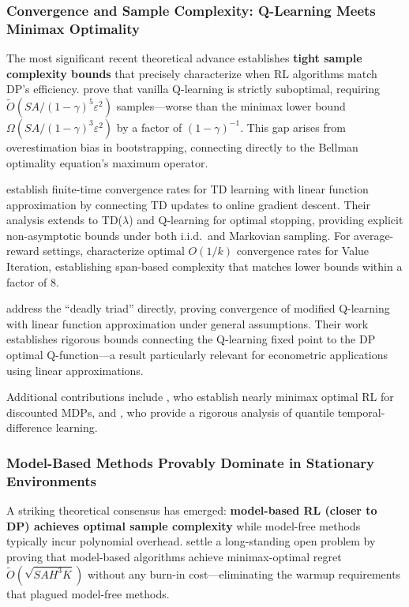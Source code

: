 \subsubsection{Convergence and Sample Complexity: Q-Learning Meets Minimax Optimality}

The most significant recent theoretical advance establishes \textbf{tight sample complexity bounds} that precisely characterize when RL algorithms match DP's efficiency. \citet{li2024minimax} prove that vanilla Q-learning is strictly suboptimal, requiring $\tilde{O}(SA/(1-\gamma)^5\varepsilon^2)$ samples---worse than the minimax lower bound $\Omega(SA/(1-\gamma)^3\varepsilon^2)$ by a factor of $(1-\gamma)^{-1}$. This gap arises from overestimation bias in bootstrapping, connecting directly to the Bellman optimality equation's maximum operator.

\citet{bhandari2021finite} establish finite-time convergence rates for TD learning with linear function approximation by connecting TD updates to online gradient descent. Their analysis extends to TD($\lambda$) and Q-learning for optimal stopping, providing explicit non-asymptotic bounds under both i.i.d.\ and Markovian sampling. For average-reward settings, \citet{lee2025optimal} characterize optimal $O(1/k)$ convergence rates for Value Iteration, establishing span-based complexity that matches lower bounds within a factor of 8.

\citet{carvalho2020convergence} address the ``deadly triad'' directly, proving convergence of modified Q-learning with linear function approximation under general assumptions. Their work establishes rigorous bounds connecting the Q-learning fixed point to the DP optimal Q-function---a result particularly relevant for econometric applications using linear approximations.

Additional contributions include \citet{he2021nearly}, who establish nearly minimax optimal RL for discounted MDPs, and \citet{rowland2024quantile}, who provide a rigorous analysis of quantile temporal-difference learning.

\subsubsection{Model-Based Methods Provably Dominate in Stationary Environments}

A striking theoretical consensus has emerged: \textbf{model-based RL (closer to DP) achieves optimal sample complexity} while model-free methods typically incur polynomial overhead. \citet{zhang2024settling} settle a long-standing open problem by proving that model-based algorithms achieve minimax-optimal regret $\tilde{O}(\sqrt{SAH^3K})$ without any burn-in cost---eliminating the warmup requirements that plagued model-free methods.

